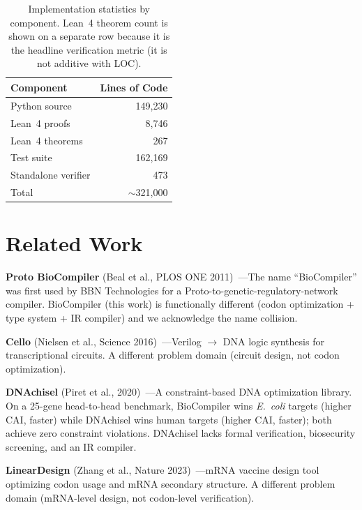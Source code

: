 \documentclass[11pt,a4paper]{article}
\theoremstyle{definition}
\begin{document}
\begin{table}[!ht]
\centering
\begin{tabular}{lr}
\toprule
\textbf{Component} & \textbf{Lines of Code} \\
\midrule
Python source & 149{,}230 \\
Lean~4 proofs & 8{,}746 \\
\quad Lean~4 theorems & 267 \\
Test suite & 162{,}169 \\
Standalone verifier & 473 \\
\midrule
Total & $\sim$321{,}000 \\
\bottomrule
\end{tabular}
\caption{Implementation statistics by component. Lean~4 theorem count is shown on a separate row because it is the headline verification metric (it is not additive with LOC).}
\label{tab:impl}
\end{table}

\section{Related Work}\label{sec:related}

\textbf{Proto BioCompiler} (Beal et al., PLOS ONE 2011)~\cite{beal2011protobiocompiler}---The name ``BioCompiler'' was first used by BBN Technologies for a Proto-to-genetic-regulatory-network compiler. BioCompiler (this work) is functionally different (codon optimization + type system + IR compiler) and we acknowledge the name collision.

\textbf{Cello} (Nielsen et al., Science 2016)~\cite{nielsen2016cello}---Verilog $\to$ DNA logic synthesis for transcriptional circuits. A different problem domain (circuit design, not codon optimization).

\textbf{DNAchisel} (Piret et al., 2020)~\cite{piret2020dnachisel}---A constraint-based DNA optimization library. On a 25-gene head-to-head benchmark, BioCompiler wins \emph{E.~coli} targets (higher CAI, faster) while DNAchisel wins human targets (higher CAI, faster); both achieve zero constraint violations. DNAchisel lacks formal verification, biosecurity screening, and an IR compiler.

\textbf{LinearDesign} (Zhang et al., Nature 2023)~\cite{zhang2023lineardesign}---mRNA vaccine design tool optimizing codon usage and mRNA secondary structure. A different problem domain (mRNA-level design, not codon-level verification).
\end{document}
